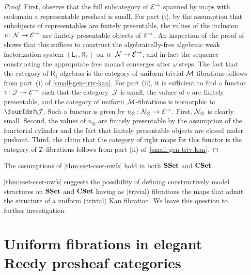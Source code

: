 \documentclass[reqno,10pt,a4paper,oneside,draft]{amsart}
\begin{document}
\begin{proof}
First, observe that the full subcategory of $\catE^\to$ spanned by maps with codomain a representable presheaf is small.
For part (i), by the assumption that subobjects of representables are finitely presentable, the values of the inclusion $u \co \cal{N} \to \cal{E}^\to$ are finitely presentable objects of $\cal{E}^\to$.
An inspection of the proof of \cite[Proposition 4.22]{garner:small-object-argument} shows that this suffices to construct the algebraically-free algebraic weak factorization system $(\mathsf{L}_1, \mathsf{R}_1)$ on $u \co \cal{N} \to \cal{E}^\to$, and in fact the sequence constructing the appropriate free monad converges after $\omega$ steps.
The fact that the category of $\mathsf{R}_1$-algebras is the category of uniform trivial $\cal{M}$-fibrations follows from part~(i) of \cref{small-gen-triv-kan}.
For part (ii), it is sufficient to find a functor $v \co \cal{J} \rightarrow \catE^\to$ such that the category~$\cal{J}$ is small, the values of $v$ are finitely presentable, and the category of uniform $\cal{M}$-fibrations is isomorphic to~$\liftr{\cal{J}}$.
Such a functor is given by $u_\otimes \co \cal{N}_\otimes \rightarrow \catE^\to$.
First, $\cal{N}_\otimes$ is clearly small.
Second, the values of $u_\otimes$ are finitely presentable by the assumption of the functorial cylinder and the fact that finitely presentable objects are closed under pushout.
Third, the claim that the category of right maps for this functor is the category of $\cal{I}$-fibrations follows from part (ii) of~\cref{small-gen-triv-kan}.
\end{proof}

\begin{example}
The assumptions of \cref{thm:sset-cset-nwfs} hold in both $\SSet$ and $\CSet$.
\end{example}

\cref{thm:sset-cset-nwfs} suggests the possibility of defining constructively model structures on $\SSet$ and $\CSet$ having as (trivial) fibrations the maps that admit the structure of a uniform (trivial) Kan fibration.
We leave this question to further investigation.


\section{Uniform fibrations in elegant Reedy presheaf categories}
\label{sec:non-alg}
\end{document}
